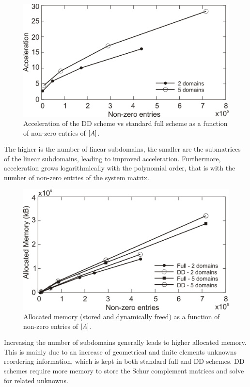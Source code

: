 \begin{figure}[!ht]
\centering
\includegraphics[width=12cm]{accelerationorder}
\caption{Acceleration of the DD scheme vs standard full scheme as a function of non-zero entries of $\left[A\right]$.}
\label{fig:accelerationorder}
\end{figure}

The higher is the number of linear subdomains, the smaller are the submatrices of the linear subdomains,
leading to improved acceleration. Furthermore, acceleration grows logarithmically with the polynomial
order, that is with the number of non-zero entries of the system matrix.

\begin{figure}[!ht]
\centering
\includegraphics[width=12cm]{memcirc}
\caption{Allocated memory (stored and dynamically freed) as a function of non-zero entries of $\left[A\right]$.}
\label{fig:memcirc}
\end{figure}

Increasing the number of subdomains generally leads to higher allocated memory. This is mainly due to an
increase of geometrical and finite elements unknowns reordering information, which is kept in both standard
full and DD schemes. DD schemes require more memory to store the Schur complement matrices and solve
for related unknowns.


